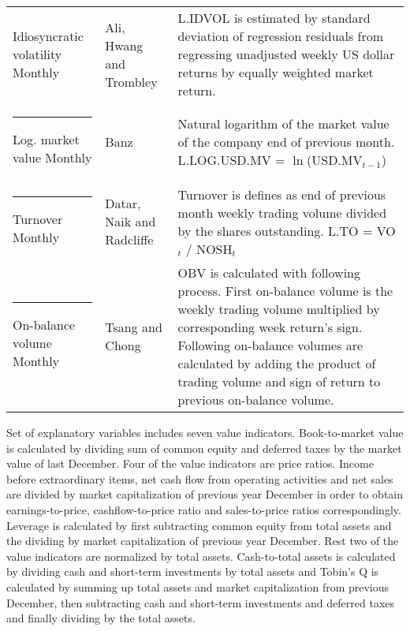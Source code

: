 \documentclass{article}
\begin{document}
{{\begin{xltabular}{\textwidth}{ >{\raggedright\arraybackslash}p{0.23\textwidth} >{\raggedright\arraybackslash}p{0.2\textwidth} X}
Idiosyncratic volatility \newline Monthly & Ali, Hwang and Trombley \citeyear{ali2003}	& L.IDVOL is estimated by standard deviation of regression residuals from regressing unadjusted weekly US dollar returns by equally weighted market return. \\ \rule{-1ex}{3ex}
Log. market value \newline Monthly 	& Banz \citeyear{BANZ1981}				& Natural logarithm of the market value of the company end of previous month. \newline L.LOG.USD.MV = $\ln$(USD.MV$_{t-1}$)\\ \rule{-1ex}{3ex}
Turnover \newline Monthly 		& Datar, Naik and Radcliffe \citeyear{datar1998} & Turnover is defines as end of previous month weekly trading volume divided by the shares outstanding. \newline L.TO = VO$_t$ / NOSH$_t$ \\ \rule{-1ex}{3ex}
On-balance volume \newline Monthly & Tsang and Chong \citeyear{tsang2009}		& OBV is calculated with following process. First on-balance volume is the weekly trading volume multiplied by corresponding week return's sign. Following on-balance volumes are calculated by adding the product of trading volume and sign of return to previous on-balance volume.\\ 
\bottomrule
\end{xltabular}
}}

Set of explanatory variables includes seven value indicators. Book-to-market value is calculated by dividing sum of common equity and deferred taxes by the market value of last December. Four of the value indicators are price ratios. Income before extraordinary items, net cash flow from operating activities and net sales are divided by market capitalization of previous year December in order to obtain earnings-to-price, cashflow-to-price ratio and sales-to-price ratios correspondingly. Leverage is calculated by first subtracting common equity from total assets and the dividing by market capitalization of previous year December. Rest two of the value indicators are normalized by total assets. Cash-to-total assets is calculated by dividing cash and short-term investments by total assets and Tobin's Q is calculated by summing up total assets and market capitalization from previous December, then subtracting cash and short-term investments and deferred taxes and finally dividing by the total assets. \par
\end{document}
